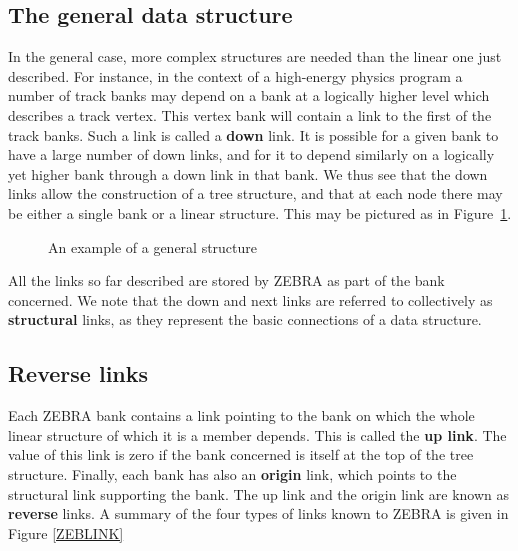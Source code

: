\subsection{The general data structure}
\par
In the general case, more complex structures are needed than the linear
one just described. For instance, in the context of a high-energy
physics program a number of track banks may depend on a bank at a
logically higher level which
describes a track vertex. This vertex bank will
contain a link to the first of the track banks. Such a link is called a
{\bf down} link.
It is possible for a given bank to have a large number of
down links, and for it to depend similarly on a logically yet higher bank
through a down link in that bank.
We thus see that the down links allow the construction of
a tree structure, and that at each node there may be either a
single bank or a linear structure. This may be pictured as in
Figure~\ref{GENSTRC}.
\begin{figure}[h]
\caption{An example of a general structure}
\label{GENSTRC}
\end{figure}
All the links so far described are stored by ZEBRA as part of the bank
concerned. We note that the down and next links are referred to collectively
as {\bf structural} links, as they represent the basic connections
of a data structure.
\subsection{Reverse links}
\par
Each ZEBRA bank contains a link pointing to the bank on which the
whole linear structure of which it is a member depends. This is called
the {\bf up link}. The value of
this link is zero if the bank concerned is itself at the top of the tree
structure.
Finally, each bank has also an {\bf origin} link, which points
to the structural link supporting the bank.
The up link and the origin link are
known as {\bf reverse} links.
A summary of the four types of links known to ZEBRA is given in
Figure \ref{ZEBLINK}

